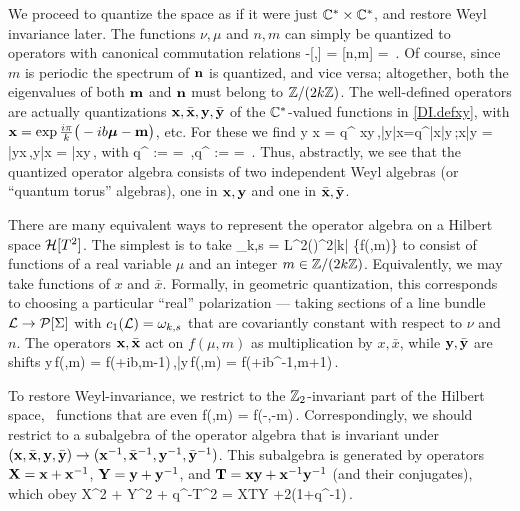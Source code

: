 \documentclass[12pt]{article}
\begin{document}
We proceed to quantize the space as if it were just ${\mathbb C}^*\times{\mathbb C}^*$, and restore Weyl invariance later.
The functions $\nu,\mu$ and $n,m$ can simply be quantized to operators with canonical commutation relations
%
\DIbe -[\bm \nu,\bm \mu] = [\mb n,\mb m] = \,. \label{DI.nmcomm} \DIee
%
Of course, since $m$ is periodic the spectrum of $\mathbf n$ is quantized, and vice versa; altogether, both the eigenvalues of both $\mathbf m$ and $\mathbf n$ must belong to ${\mathbb Z}/(2k{\mathbb Z})$. The well-defined operators are actually quantizations $\mathbf x,\bar{\mathbf x},\mathbf y,\bar{\mathbf y}$ of the ${\mathbb C}^*$-valued functions in \eqref{DI.defxy}, with  $\mathbf x = \exp \frac{i\pi }{k}\big(-ib\bm\mu-\mathbf m\big)$, etc. For these we find
%
\DIbe \mb y \mb x  = q^{} \mb x\mb y\,,\quad \bar{\mb y}\bar{\mb x}=\tilde q^{}\bar{\mb x}\bar{\mb y}\,;\qquad \mb x\bar{\mb y} = \bar{\mb y}{\mb x}\,,\quad  \mb y\bar{\mb x} = \bar{\mb x}{\mb y}\,, \label{DI.qtorus} \DIee
%
with
%
\DIbe q^{} := \exp {} = \,,\qquad \tilde q^{} := \exp {} = \,. \label{DI.qq} \DIee
%
Thus, abstractly, we see that the quantized operator algebra consists of two independent Weyl algebras (or ``quantum torus'' algebras), one in $\mathbf x,\mathbf y$ and one in $\bar{\mathbf x},\bar{\mathbf y}$.

There are many equivalent ways to represent the operator algebra on a Hilbert space $\mathcal{H}[T^2]$. The simplest is to take
%
\DIbe \CalH[T^2]_{k,s} = L^2(\BR)\otimes \BC^{2|k|} \simeq \{f(\mu,m)\} \label{DI.Hks} \DIee
%
to consist of functions of a real variable $\mu$ and an integer $m\in {\mathbb Z}/(2k{\mathbb Z})$. Equivalently, we may take functions of $x$ and $\bar x$. Formally, in geometric quantization, this corresponds to choosing a particular ``real'' polarization --- taking sections of a line bundle $\mathcal{L}\to\mathcal{P}[\Sigma]$ with $c_1(\mathcal{L})=\omega_{k,s}$ that are covariantly constant with respect to $\nu$ and $n$. The operators $\mathbf x,\bar{\mathbf x}$ act on $f(\mu,m)$ as multiplication by $x,\bar x$, while $\mathbf y,\bar{\mathbf y}$ are shifts
%
\DIbe \mb y\,f(\mu,m) = f(\mu+ib,m-1)\,,\qquad \bar{\mb y}\,f(\mu,m) = f(\mu+ib^{-1},m+1)\,.\DIee


To restore Weyl-invariance, we restrict to the ${\mathbb Z}_2$-invariant part of the Hilbert space, \DIie\ functions that are even
%
\DIbe f(\mu,m) = f(-\mu,-m)\,. \label{DI.Weyl} \DIee
%
Correspondingly, we should restrict to a subalgebra of the operator algebra that is invariant under $(\mathbf x,\bar{\mathbf x},\mathbf y,\bar{\mathbf y})\to(\mathbf x^{-1},\bar{\mathbf x}^{-1},\mathbf y^{-1},\bar{\mathbf y}^{-1})$. This subalgebra is generated by operators $\mathbf X=\mathbf x+\mathbf x^{-1}$, $\mathbf Y=\mathbf y+ \mathbf y^{-1}$, and $\mathbf T=\mathbf{xy} + \mathbf x^{-1} \mathbf y^{-1}$ (and their conjugates), which obey
%
\DIbe \mb X^2 + \mb Y^2 + q^{-}\mb T^2 = \mb X\mb T\mb Y +2(1+q^{-1})\,. \DIee
\end{document}

